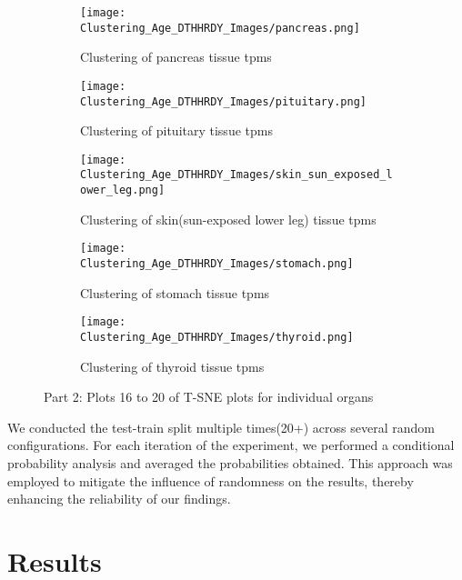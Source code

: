 \documentclass[twocolumn]{article}
\begin{document}
    \begin{figure}[H]
    \ContinuedFloat
    \centering
    \begin{subfigure}{0.3\linewidth}
        \texttt{[image: Clustering\_Age\_DTHHRDY\_Images/pancreas.png]}
        \caption{Clustering of pancreas tissue tpms}
    \end{subfigure}
    \hfill
    \begin{subfigure}{0.3\linewidth}
        \texttt{[image: Clustering\_Age\_DTHHRDY\_Images/pituitary.png]}
        \caption{Clustering of pituitary tissue tpms}
    \end{subfigure}
    \hfill
    \begin{subfigure}{0.3\linewidth}
        \texttt{[image: Clustering\_Age\_DTHHRDY\_Images/skin\_sun\_exposed\_lower\_leg.png]}
        \caption{Clustering of skin(sun-exposed lower leg) tissue tpms}
    \end{subfigure}

    \vspace{1em}

    \begin{subfigure}{0.3\linewidth}
        \texttt{[image: Clustering\_Age\_DTHHRDY\_Images/stomach.png]}
        \caption{Clustering of stomach tissue tpms}
    \end{subfigure}
    \hfill
    \begin{subfigure}{0.3\linewidth}
        \texttt{[image: Clustering\_Age\_DTHHRDY\_Images/thyroid.png]}
        \caption{Clustering of thyroid tissue tpms}
    \end{subfigure}
    \hfill

   \caption{Part 2: Plots 16 to 20 of T-SNE plots for individual organs}
    \label{fig:T-SNE plots for individual organs_part2}
\end{figure}

We conducted the test-train split multiple times(20+) across several random configurations. For each iteration of the experiment, we performed a conditional probability analysis and averaged the probabilities obtained. This approach was employed to mitigate the influence of randomness on the results, thereby enhancing the reliability of our findings.

\section{Results}
\end{document}
